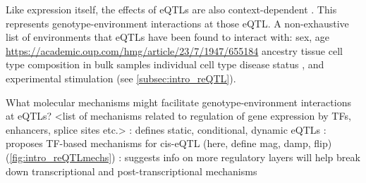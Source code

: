 \begin{outline}
\1 Like expression itself, the effects of \glspl{eQTL} are also context-dependent \autocite{albert2015RoleRegulatoryVariation,vandiedonck2017GeneticAssociationMolecular}.
    \2 This represents genotype-environment interactions at those eQTL.
    \2 A non-exhaustive list of environments that \glspl{eQTL} have been found to interact with:
        \3 sex, age \url{https://academic.oup.com/hmg/article/23/7/1947/655184}
        \3 ancestry \autocite{dejager2015ImmVarProjectInsights,nedelec2016GeneticAncestryNatural,quach2017LivingAdaptiveWorld}
        \3 tissue \autocite{nica2011ArchitectureGeneRegulatory,aguet2017GeneticEffectsGene}
        \3 cell type composition in bulk samples \autocite{westra2015CellSpecificEQTL,zhernakova2017IdentificationContextdependentExpression,glastonbury2019CellTypeHeterogeneityAdipose,kim-hellmuth2019CellTypeSpecific}
        \3 individual cell type \autocite{dimas2009CommonRegulatoryVariation,dejager2015ImmVarProjectInsights,peters2016InsightGenotypePhenotypeAssociations,chen2016GeneticDriversEpigenetic,kim-hellmuth2019CellTypeSpecific}
        \3 disease status \autocite{peters2016InsightGenotypePhenotypeAssociations},
        \3 and experimental stimulation (see \cref{subsec:intro_reQTL}).

\1 What molecular mechanisms might facilitate genotype-environment interactions at \glspl{eQTL}?
    \2 <list of mechanisms related to regulation of gene expression by TFs, enhancers, splice sites etc.>
        \3 \autocite{ackermann2013ImpactNaturalGenetic}: defines static, conditional, dynamic eQTLs
        \3 \textcite{fu2012UnravelingRegulatoryMechanisms}: proposes TF-based mechanisms for cis-eQTL (here, define mag, damp, flip) (\cref{fig:intro_reQTLmechs})
        \3 \textcite{gaffney2013GlobalPropertiesFunctional,rotival2019CharacterisingGeneticBasis}: suggests info on more regulatory layers will help break down transcriptional and post-transcriptional mechanisms


\end{outline}
